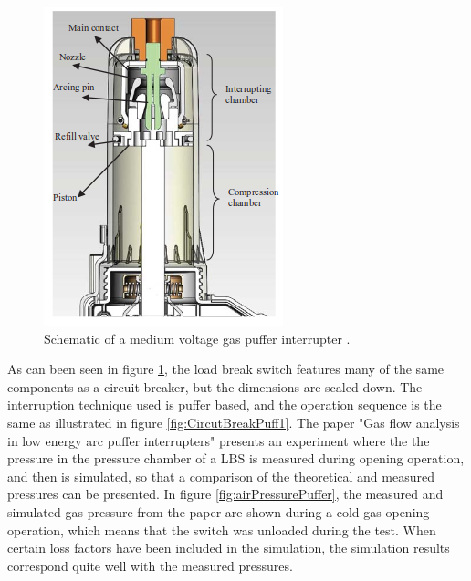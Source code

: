 \documentclass[10pt,b5paper,twoside]{article}
\begin{document}
\begin{figure} [H]
\centering
\includegraphics[scale=0.6]{Bilder/Theory/LBSselfblastandPuffer.png}
\caption{Schematic of a medium voltage gas puffer interrupter \cite{bib:GFALEAPI}.} \label{fig:selfBlastandPuffer}
\end{figure}

As can been seen in figure \ref{fig:selfBlastandPuffer}, the load break switch features many of the same components as a circuit breaker, but the dimensions are scaled down. The interruption technique used is puffer based, and the operation sequence is the same as illustrated in figure \ref{fig:CircutBreakPuff1}. The paper "Gas flow analysis in low energy arc puffer interrupters" \cite{bib:GFALEAPI} presents an experiment where the the pressure in the pressure chamber of a LBS is measured during opening operation, and then is simulated, so that a comparison of the theoretical and measured pressures can be presented. In figure \ref{fig:airPressurePuffer}, the measured and simulated gas pressure from the paper are shown during a cold gas opening operation, which means that the switch was unloaded during the test. When certain loss factors have been included in the simulation, the simulation results correspond quite well with the measured pressures.
\end{document}

